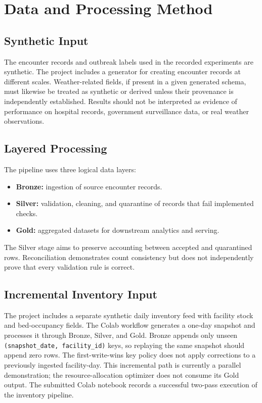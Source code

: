 \documentclass[conference]{IEEEtran}
\begin{document}
\section{Data and Processing Method}

\subsection{Synthetic Input}

The encounter records and outbreak labels used in the recorded experiments are synthetic. The project includes a generator for creating encounter records at different scales. Weather-related fields, if present in a given generated schema, must likewise be treated as synthetic or derived unless their provenance is independently established. Results should not be interpreted as evidence of performance on hospital records, government surveillance data, or real weather observations.

\subsection{Layered Processing}

The pipeline uses three logical data layers:
\begin{itemize}
    \item \textbf{Bronze:} ingestion of source encounter records.
    \item \textbf{Silver:} validation, cleaning, and quarantine of records that fail implemented checks.
    \item \textbf{Gold:} aggregated datasets for downstream analytics and serving.
\end{itemize}

The Silver stage aims to preserve accounting between accepted and quarantined rows. Reconciliation demonstrates count consistency but does not independently prove that every validation rule is correct.

\subsection{Incremental Inventory Input}

The project includes a separate synthetic daily inventory feed with facility stock and bed-occupancy fields. The Colab workflow generates a one-day snapshot and processes it through Bronze, Silver, and Gold. Bronze appends only unseen \texttt{(snapshot\_date, facility\_id)} keys, so replaying the same snapshot should append zero rows. The first-write-wins key policy does not apply corrections to a previously ingested facility-day. This incremental path is currently a parallel demonstration; the resource-allocation optimizer does not consume its Gold output. The submitted Colab notebook records a successful two-pass execution of the inventory pipeline.
\end{document}
